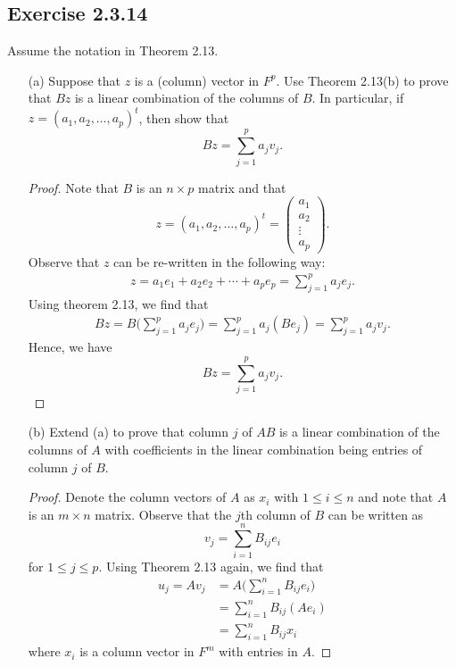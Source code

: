 \subsection*{Exercise 2.3.14} Assume the notation in Theorem 2.13.
\begin{enumerate}
    \item[(a)] Suppose that \( z  \) is a (column) vector in \( F^{p} \). Use Theorem 2.13(b) to prove that \( Bz  \) is a linear combination of the columns of \( B  \). In particular, if \( z = ({a}_{1}, {a}_{2}, \dots, {a}_{p})^{t} \), then show that  
        \[  Bz = \sum_{ j=1  }^{ p  } {a}_{j} {v}_{j}. \]
        \begin{proof}
        Note that \( B  \) is an \( n \times  p  \) matrix and that 
        \[  z = ({a}_{1}, {a}_{2}, \dots, {a}_{p})^{t} = \begin{pmatrix}
            {a}_{1} \\
            {a}_{2} \\
            \vdots \\
            {a}_{p}
        \end{pmatrix}. \]
        Observe that \( z  \) can be re-written in the following way:
        \begin{align*}
            z = {a}_{1} {e}_{1} + {a}_{2} {e}_{2} + \cdots + {a}_{p} {e}_{p}  
              = \sum_{ j=1  }^{ p  } {a}_{j } {e}_{j }.
        \end{align*}
        Using theorem 2.13, we find that
        \begin{align*}
            Bz = B \Big( \sum_{ j=1  }^{ p } {a}_{j} {e}_{j} \Big)
               = \sum_{ j=1  }^{ p } {a}_{j} (B {e}_{j}) 
               =  \sum_{ j=1  }^{ p } {a}_{j} {v}_{j}.
        \end{align*}
        Hence, we have
        \[  Bz = \sum_{ j=1  }^{ p } {a}_{j} {v}_{j}. \]


        \end{proof}
    \item[(b)] Extend (a) to prove that column \( j  \) of \( AB  \) is a linear combination of the columns of \( A  \) with coefficients in the linear combination being entries of column \( j  \) of \(  B \). 
        \begin{proof}
        Denote the column vectors of \( A  \) as \( {x}_{i} \) with \( 1 \leq i \leq n  \) and note that \( A  \) is an \( m \times n  \) matrix. Observe that the \( j \)th column of \( B  \) can be written as
        \[  {v}_{j} = \sum_{ i=1  }^{ n } {B}_{ij} {e}_{i} \]
        for \( 1 \leq j \leq p  \). Using Theorem 2.13 again, we find that
        \begin{align*}
            {u}_{j}  = A {v}_{j}  &= A \Big( \sum_{ i=1  }^{ n } {B}_{ij} {e}_{i} \Big) \\
                                  &= \sum_{ i=1  }^{ n } {B}_{ij} ({Ae}_{i}) \\
                                  &= \sum_{ i=1  }^{ n } {B}_{ij} {x}_{i}
        \end{align*}
        where \( {x}_{i}  \) is a column vector in \( F^{m} \) with entries in \(  A  \). 


\end{proof}
\end{enumerate}
